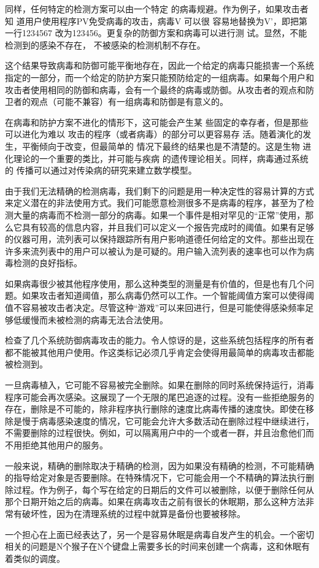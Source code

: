 同样，任何特定的检测方案可以由一个特定
的病毒规避。作为例子，如果攻击者知
道用户使用程序PV免受病毒的攻击，病毒V 可以很
容易地替换为V’，即把第一行1234567
改为123456。更复杂的防御方案和病毒可以进行测
试。显然，不能检测到的感染不存在，
不被感染的检测机制不存在。


这个结果导致病毒和防御可能平衡地存在，因此一个给定的病毒只能损害一个系统指定的一部分，而一个给定的防护方案只能预防给定的一组病毒。如果每个用户和攻击者使用相同的防御和病毒，会有一个最终的病毒或防御。从攻击者的观点和防卫者的观点（可能不兼容）有一组病毒和防御是有意义的。


在病毒和防护方案不进化的情形下，这可能会产生某
些固定的幸存者，但是那些可以进化为难以
攻击的程序（或者病毒）的部分可以更容易存
活。随着演化的发生，平衡倾向于改变，但最简单的
情况下最终的结果也是不清楚的。这是生物
进化理论的一个重要的类比，并可能与疾病
的遗传理论相关。同样，病毒通过系统的
传播可以通过对传染病的研究来建立数学模型。


由于我们无法精确的检测病毒，我们剩下的问题是用一种决定性的容易计算的方式来定义潜在的非法使用方式。我们可能愿意检测很多不是病毒的程序，甚至为了检测大量的病毒而不检测一部分的病毒。如果一个事件是相对罕见的“正常”使用，那么它具有较高的信息内容，并且我们可以定义一个报告完成时的阈值。如果有足够的仪器可用，流列表可以保持跟踪所有用户影响道德任何给定的文件。那些出现在许多来流列表中的用户可以被认为是可疑的。用户输入流列表的速率也可以作为病毒检测的良好指标。

如果病毒很少被其他程序使用，那么这种类型的测量是有价值的，但是也有几个问题。如果攻击者知道阈值，那么病毒仍然可以工作。一个智能阈值方案可以使得阈值不容易被攻击者决定。尽管这种“游戏”可以来回进行，但是可能使得感染频率足够低缓慢而未被检测的病毒无法合法使用。

检查了几个系统防御病毒攻击的能力。令人惊讶的是，这些系统包括程序的所有者都不能被其他用户使用。作这类标记必须几乎肯定会使得用最简单的病毒攻击都能被检测到。

一旦病毒植入，它可能不容易被完全删除。如果在删除的同时系统保持运行，消毒程序可能会再次感染。这展现了一个无限的尾巴追逐的过程。没有一些拒绝服务的存在，删除是不可能的，除非程序执行删除的速度比病毒传播的速度快。即使在移除是慢于病毒感染速度的情况，它可能会允许大多数活动在删除过程中继续进行，不需要删除的过程很快。例如，可以隔离用户中的一个或者一群，并且治愈他们而不用拒绝其他用户的服务。

一般来说，精确的删除取决于精确的检测，因为如果没有精确的检测，不可能精确的指导给定对象是否要删除。在特殊情况下，它可能会用一个不精确的算法执行删除过程。作为例子，每个写在给定的日期后的文件可以被删除，以便于删除任何从那个日期开始之后的病毒。如果在病毒攻击之前有很长的休眠期，那么这种方法非常有破坏性，因为在清理系统的过程中就算是备份也要被移除。

一个担心在上面已经表达了，另一个是容易休眠是病毒自发产生的机会。一个密切相关的问题是N个猴子在N个键盘上需要多长的时间来创建一个病毒，这和休眠有着类似的调度。


